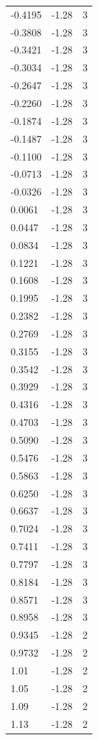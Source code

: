 \begin{longtable}{lrr}
  -0.4195 & -1.28 & 3 \\
  -0.3808 & -1.28 & 3 \\
  -0.3421 & -1.28 & 3 \\
  -0.3034 & -1.28 & 3 \\
  -0.2647 & -1.28 & 3 \\
  -0.2260 & -1.28 & 3 \\
  -0.1874 & -1.28 & 3 \\
  -0.1487 & -1.28 & 3 \\
  -0.1100 & -1.28 & 3 \\
  -0.0713 & -1.28 & 3 \\
  -0.0326 & -1.28 & 3 \\
  0.0061 & -1.28 & 3 \\
  0.0447 & -1.28 & 3 \\
  0.0834 & -1.28 & 3 \\
  0.1221 & -1.28 & 3 \\
  0.1608 & -1.28 & 3 \\
  0.1995 & -1.28 & 3 \\
  0.2382 & -1.28 & 3 \\
  0.2769 & -1.28 & 3 \\
  0.3155 & -1.28 & 3 \\
  0.3542 & -1.28 & 3 \\
  0.3929 & -1.28 & 3 \\
  0.4316 & -1.28 & 3 \\
  0.4703 & -1.28 & 3 \\
  0.5090 & -1.28 & 3 \\
  0.5476 & -1.28 & 3 \\
  0.5863 & -1.28 & 3 \\
  0.6250 & -1.28 & 3 \\
  0.6637 & -1.28 & 3 \\
  0.7024 & -1.28 & 3 \\
  0.7411 & -1.28 & 3 \\
  0.7797 & -1.28 & 3 \\
  0.8184 & -1.28 & 3 \\
  0.8571 & -1.28 & 3 \\
  0.8958 & -1.28 & 3 \\
  0.9345 & -1.28 & 2 \\
  0.9732 & -1.28 & 2 \\
  1.01 & -1.28 & 2 \\
  1.05 & -1.28 & 2 \\
  1.09 & -1.28 & 2 \\
  1.13 & -1.28 & 2 \\

\end{longtable}
